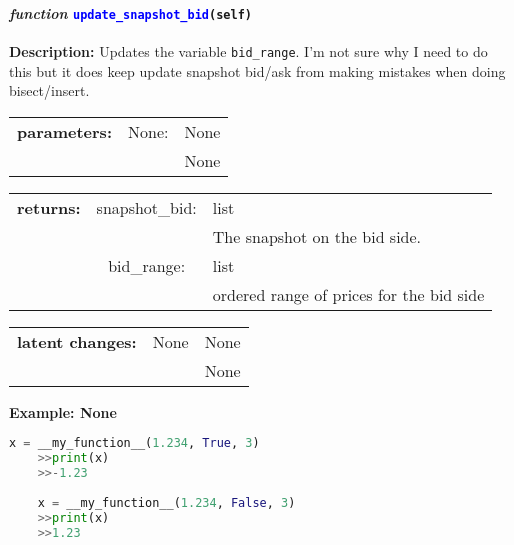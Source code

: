 \paragraph{\textit{function} \textcolor{blue}{\texttt{update\_snapshot\_bid}}\texttt{(self)}}\hfill\break
\noindent \textbf{Description:} Updates the variable \texttt{bid\_range}. I'm not sure why I need to do this but it does keep update snapshot bid/ask from making mistakes when doing bisect/insert. 


\begin{tabular}{r r l }
	\textbf{parameters:}	& None: & None\\
	&  & None\\
\end{tabular}

\begin{tabular}{l c l}
	\textbf{returns:} & snapshot\_bid: & list\\
	& & The snapshot on the bid side. \\
	& bid\_range: & list\\
	&& ordered range of prices for the bid side \\
\end{tabular}

\begin{tabular}{l c l}
	\textbf{latent changes:} & None & None\\
	& &  None
\end{tabular}

\textbf{Example: None}
\begin{lstlisting}[language=Python]
	x = __my_function__(1.234, True, 3)
	>>print(x)
	>>-1.23
	
	x = __my_function__(1.234, False, 3)
	>>print(x)
	>>1.23
\end{lstlisting}
